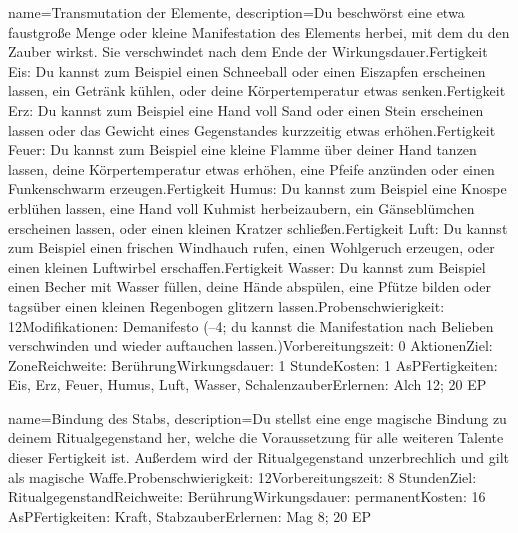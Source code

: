 {
    name={Transmutation der Elemente},
    description={Du beschwörst eine etwa faustgroße Menge oder kleine Manifestation des Elements herbei, mit dem du den Zauber wirkst. Sie verschwindet nach dem Ende der Wirkungsdauer.\newline Fertigkeit Eis: Du kannst zum Beispiel einen Schneeball oder einen Eiszapfen erscheinen lassen, ein Getränk kühlen, oder deine Körpertemperatur etwas senken.\newline Fertigkeit Erz: Du kannst zum Beispiel eine Hand voll Sand oder einen Stein erscheinen lassen oder das Gewicht eines Gegenstandes kurzzeitig etwas erhöhen.\newline Fertigkeit Feuer: Du kannst zum Beispiel eine kleine Flamme über deiner Hand tanzen lassen, deine Körpertemperatur etwas erhöhen, eine Pfeife anzünden  oder einen Funkenschwarm erzeugen.\newline Fertigkeit Humus: Du kannst zum Beispiel eine Knospe erblühen lassen, eine Hand voll Kuhmist herbeizaubern, ein Gänseblümchen erscheinen lassen, oder einen kleinen Kratzer schließen.\newline Fertigkeit Luft: Du kannst zum Beispiel einen frischen Windhauch rufen, einen Wohlgeruch erzeugen, oder einen kleinen Luftwirbel erschaffen.\newline Fertigkeit Wasser: Du kannst zum Beispiel einen Becher mit Wasser füllen, deine Hände abspülen, eine Pfütze bilden oder tagsüber einen kleinen Regenbogen glitzern lassen.\newline Probenschwierigkeit: 12\newline Modifikationen: Demanifesto (–4; du kannst die Manifestation nach Belieben verschwinden und wieder auftauchen lassen.)\newline Vorbereitungszeit: 0 Aktionen\newline Ziel: Zone\newline Reichweite: Berührung\newline Wirkungsdauer: 1 Stunde\newline Kosten: 1 AsP\newline Fertigkeiten: Eis, Erz, Feuer, Humus, Luft, Wasser, Schalenzauber\newline Erlernen: Alch 12; 20 EP}
}


{
    name={Bindung des Stabs},
    description={Du stellst eine enge magische Bindung zu deinem Ritualgegenstand her, welche die Voraussetzung für alle weiteren Talente dieser Fertigkeit ist. Außerdem wird der Ritualgegenstand unzerbrechlich und gilt als magische Waffe.\newline Probenschwierigkeit: 12\newline Vorbereitungszeit: 8 Stunden\newline Ziel: Ritualgegenstand\newline Reichweite: Berührung\newline Wirkungsdauer: permanent\newline Kosten: 16 AsP\newline Fertigkeiten: Kraft, Stabzauber\newline Erlernen: Mag 8; 20 EP}
}


